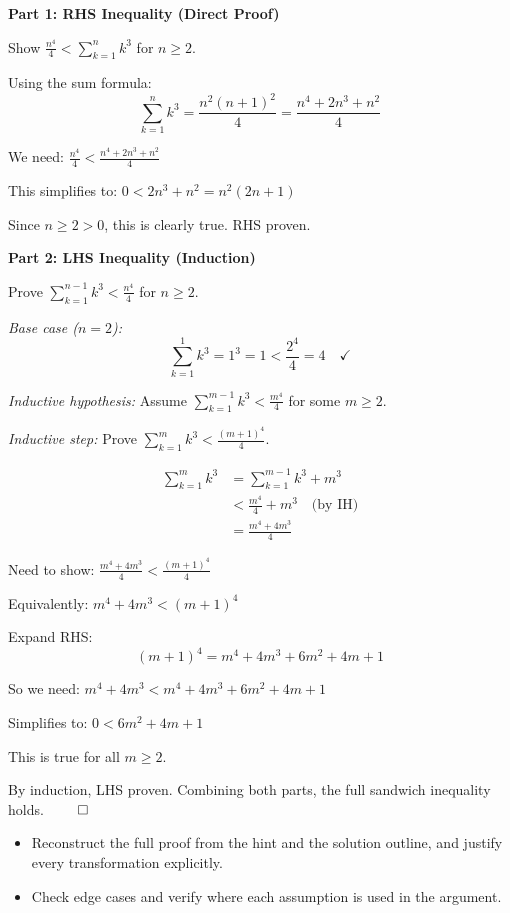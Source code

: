 \begin{solution}
\textbf{Part 1: RHS Inequality (Direct Proof)}

Show $\frac{n^4}{4} < \sum_{k=1}^{n} k^3$ for $n \geq 2$.

Using the sum formula:
\[
\sum_{k=1}^{n} k^3 = \frac{n^2(n+1)^2}{4} = \frac{n^4 + 2n^3 + n^2}{4}
\]

We need: $\frac{n^4}{4} < \frac{n^4 + 2n^3 + n^2}{4}$

This simplifies to: $0 < 2n^3 + n^2 = n^2(2n + 1)$

Since $n \geq 2 > 0$, this is clearly true. RHS proven. \checkmark

\vspace{0.5cm}

\textbf{Part 2: LHS Inequality (Induction)}

Prove $\sum_{k=1}^{n-1} k^3 < \frac{n^4}{4}$ for $n \geq 2$.

\vspace{0.3cm}

\textit{Base case ($n=2$):}
\[
\sum_{k=1}^{1} k^3 = 1^3 = 1 < \frac{2^4}{4} = 4 \quad \checkmark
\]

\vspace{0.3cm}

\textit{Inductive hypothesis:} Assume $\sum_{k=1}^{m-1} k^3 < \frac{m^4}{4}$ for some $m \geq 2$.

\vspace{0.3cm}

\textit{Inductive step:} Prove $\sum_{k=1}^{m} k^3 < \frac{(m+1)^4}{4}$.

\begin{align*}
\sum_{k=1}^{m} k^3 &= \sum_{k=1}^{m-1} k^3 + m^3 \\
&< \frac{m^4}{4} + m^3 \quad \text{(by IH)} \\
&= \frac{m^4 + 4m^3}{4}
\end{align*}

Need to show: $\frac{m^4 + 4m^3}{4} < \frac{(m+1)^4}{4}$

Equivalently: $m^4 + 4m^3 < (m+1)^4$

Expand RHS:
\[
(m+1)^4 = m^4 + 4m^3 + 6m^2 + 4m + 1
\]

So we need: $m^4 + 4m^3 < m^4 + 4m^3 + 6m^2 + 4m + 1$

Simplifies to: $0 < 6m^2 + 4m + 1$

This is true for all $m \geq 2$. \checkmark

\vspace{0.3cm}

By induction, LHS proven. Combining both parts, the full sandwich inequality holds. $\qed$
\end{solution}

\begin{takeaways}
\begin{itemize}[leftmargin=*]
\item Reconstruct the full proof from the hint and the solution outline, and justify every transformation explicitly.
\item Check edge cases and verify where each assumption is used in the argument.
\end{itemize}
\end{takeaways}
